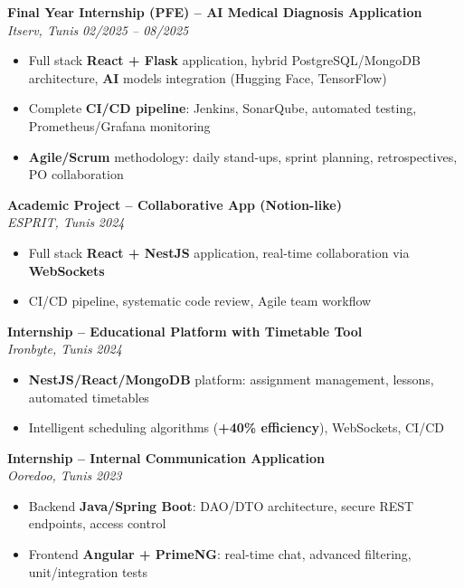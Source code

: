 \documentclass[10pt,a4paper]{article}
\begin{document}
{\small

\textbf{Final Year Internship (PFE) -- AI Medical Diagnosis Application}\\[1pt]
\textit{Itserv, Tunis} \hfill \textit{02/2025 -- 08/2025}
\begin{itemize}[leftmargin=12pt,itemsep=2pt,topsep=3pt,parsep=0pt]
  \item Full stack \textbf{React + Flask} application, hybrid PostgreSQL/MongoDB architecture, \textbf{AI} models integration (Hugging Face, TensorFlow)
  \item Complete \textbf{CI/CD pipeline}: Jenkins, SonarQube, automated testing, Prometheus/Grafana monitoring
  \item \textbf{Agile/Scrum} methodology: daily stand-ups, sprint planning, retrospectives, PO collaboration
\end{itemize}

\vspace{3pt}
\textbf{Academic Project -- Collaborative App (Notion-like)}\\[1pt]
\textit{ESPRIT, Tunis} \hfill \textit{2024}
\begin{itemize}[leftmargin=12pt,itemsep=2pt,topsep=3pt,parsep=0pt]
  \item Full stack \textbf{React + NestJS} application, real-time collaboration via \textbf{WebSockets}
  \item CI/CD pipeline, systematic code review, Agile team workflow
\end{itemize}

\vspace{3pt}
\textbf{Internship -- Educational Platform with Timetable Tool}\\[1pt]
\textit{Ironbyte, Tunis} \hfill \textit{2024}
\begin{itemize}[leftmargin=12pt,itemsep=2pt,topsep=3pt,parsep=0pt]
  \item \textbf{NestJS/React/MongoDB} platform: assignment management, lessons, automated timetables
  \item Intelligent scheduling algorithms (\textbf{+40\% efficiency}), WebSockets, CI/CD
\end{itemize}

\vspace{3pt}
\textbf{Internship -- Internal Communication Application}\\[1pt]
\textit{Ooredoo, Tunis} \hfill \textit{2023}
\begin{itemize}[leftmargin=12pt,itemsep=2pt,topsep=3pt,parsep=0pt]
  \item Backend \textbf{Java/Spring Boot}: DAO/DTO architecture, secure REST endpoints, access control
  \item Frontend \textbf{Angular + PrimeNG}: real-time chat, advanced filtering, unit/integration tests
\end{itemize}

}
\end{document}
